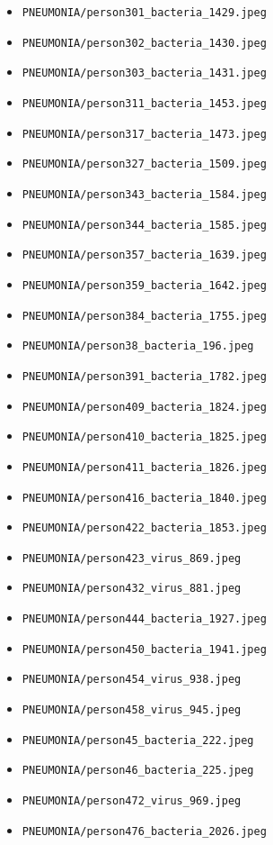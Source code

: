 \begin{itemize}
\item \texttt{PNEUMONIA/person301\_bacteria\_1429.jpeg}
\item \texttt{PNEUMONIA/person302\_bacteria\_1430.jpeg}
\item \texttt{PNEUMONIA/person303\_bacteria\_1431.jpeg}
\item \texttt{PNEUMONIA/person311\_bacteria\_1453.jpeg}
\item \texttt{PNEUMONIA/person317\_bacteria\_1473.jpeg}
\item \texttt{PNEUMONIA/person327\_bacteria\_1509.jpeg}
\item \texttt{PNEUMONIA/person343\_bacteria\_1584.jpeg}
\item \texttt{PNEUMONIA/person344\_bacteria\_1585.jpeg}
\item \texttt{PNEUMONIA/person357\_bacteria\_1639.jpeg}
\item \texttt{PNEUMONIA/person359\_bacteria\_1642.jpeg}
\item \texttt{PNEUMONIA/person384\_bacteria\_1755.jpeg}
\item \texttt{PNEUMONIA/person38\_bacteria\_196.jpeg}
\item \texttt{PNEUMONIA/person391\_bacteria\_1782.jpeg}
\item \texttt{PNEUMONIA/person409\_bacteria\_1824.jpeg}
\item \texttt{PNEUMONIA/person410\_bacteria\_1825.jpeg}
\item \texttt{PNEUMONIA/person411\_bacteria\_1826.jpeg}
\item \texttt{PNEUMONIA/person416\_bacteria\_1840.jpeg}
\item \texttt{PNEUMONIA/person422\_bacteria\_1853.jpeg}
\item \texttt{PNEUMONIA/person423\_virus\_869.jpeg}
\item \texttt{PNEUMONIA/person432\_virus\_881.jpeg}
\item \texttt{PNEUMONIA/person444\_bacteria\_1927.jpeg}
\item \texttt{PNEUMONIA/person450\_bacteria\_1941.jpeg}
\item \texttt{PNEUMONIA/person454\_virus\_938.jpeg}
\item \texttt{PNEUMONIA/person458\_virus\_945.jpeg}
\item \texttt{PNEUMONIA/person45\_bacteria\_222.jpeg}
\item \texttt{PNEUMONIA/person46\_bacteria\_225.jpeg}
\item \texttt{PNEUMONIA/person472\_virus\_969.jpeg}
\item \texttt{PNEUMONIA/person476\_bacteria\_2026.jpeg}

\end{itemize}
